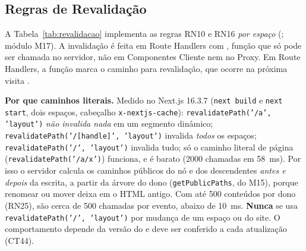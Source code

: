 \subsection{Regras de Revalidação}

A Tabela~\ref{tab:revalidacao} implementa as regras RN10 e RN16 \emph{por espaço} (; módulo M17). A invalidação é feita em Route Handlers com , função que só pode ser chamada no servidor, não em Componentes Cliente nem no Proxy. Em Route Handlers, a função marca o caminho para revalidação, que ocorre na próxima visita \cite{nextjsdocs}.

\textbf{Por que caminhos literais.} Medido no Next.js 16.3.7 (\texttt{next build} e \texttt{next start}, dois espaços, cabeçalho \texttt{x-nextjs-cache}): \texttt{revalidatePath('/a', 'layout')} \emph{não invalida nada} em um segmento dinâmico; \texttt{revalidatePath('/[handle]', 'layout')} invalida \emph{todos} os espaços; \texttt{revalidatePath('/', 'layout')} invalida tudo; só o caminho literal de página (\texttt{revalidatePath('/a/x')}) funciona, e é barato (2000 chamadas em 58~ms). Por isso o servidor calcula os caminhos públicos do nó e dos descendentes \emph{antes e depois} da escrita, a partir da árvore do dono (\texttt{getPublicPaths}, do M15), porque renomear ou mover deixa em  o HTML antigo. Com até 500 conteúdos por dono (RN25), são cerca de 500 chamadas por evento, abaixo de 10~ms. \textbf{Nunca} se usa \texttt{revalidatePath('/', 'layout')} por mudança de um espaço ou do site. O comportamento depende da versão do  e deve ser conferido a cada atualização (CT44).

